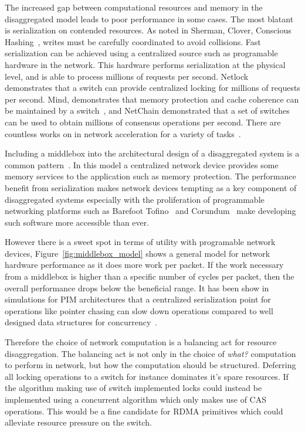 The increased gap between computational resources and memory in the
disaggregated model leads to poor performance in some cases. The most blatant is
serialization on contended resources. As noted in Sherman, Clover, Conscious
Hashing~\cite{sherman,clover,one-sided-hash}, writes must be carefully
coordinated to avoid collisions. Fast serialization can be achieved using a
centralized source such as programable hardware in the network. This hardware
performs serialization at the physical level, and is able to process millions of
requests per second. Netlock~\cite{netlock} demonstrates that a switch can
provide centralized locking for millions of requests per second. Mind,
demonstrates that memory protection and cache coherence can be maintained by a
switch~\cite{mind}, and NetChain demonstrated that a set of switches can be used
to obtain millions of consensus operations per second. There are countless works
on in network acceleration for a variety of tasks~.

Including a middlebox into the architectural design of a disaggregated system is
a common pattern~\cite{disandapp}. In this model a centralized network device
provides some memory services to the application such as memory protection. The
performance benefit from serialization makes network devices tempting as a key
component of disaggregated systems especially with the proliferation of
programmable networking platforms such as Barefoot Tofino~\cite{tofino3} and
Corundum~\cite{corundum} make developing such software more accessible than ever.

However there is a sweet spot in terms of utility with programable network
devices, Figure~\ref{fig:middlebox_model} shows a general model for network hardware
performance as it does more work per packet. If the work necessary from a
middlebox is higher than a specific number of cycles per packet, then the
overall performance drops below the beneficial range. It has been show in
simulations for PIM architectures that a centralized serialization point for
operations like pointer chasing can slow down operations compared to well
designed data structures for concurrency~.

Therefore the choice of network computation is a balancing act for resource
disaggregation. The balancing act is not only in the choice of \textit{what?}
computation to perform in network, but how the computation should be structured.
Deferring all locking operations to a switch for instance dominates it's spare
resources. If the algorithm making use of switch implemented locks could instead
be implemented using a concurrent algorithm which only makes use of CAS
operations. This would be a fine candidate for RDMA primitives which could
alleviate resource pressure on the switch.

